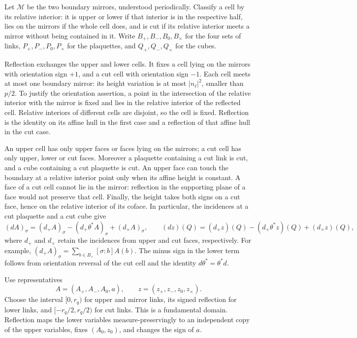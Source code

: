 \documentclass[11pt,letterpaper,reqno]{amsart}
\begin{document}
Let $\mathcal M$ be the two boundary mirrors, understood periodically.
Classify a cell by its relative interior: it is upper or lower if
that interior is in the respective half, lies on the mirrors if the
whole cell does, and is cut if its relative interior meets a mirror
without being contained in it. Write $B_+,B_-,B_0,B_\times$ for the
four sets of links, $P_+,P_-,P_0,P_\times$ for the plaquettes, and
$Q_+,Q_-,Q_\times$ for the cubes.

Reflection exchanges the upper and lower cells. It fixes a cell
lying on the mirrors with orientation sign $+1$, and a cut cell
with orientation sign $-1$. Each cell meets at most one boundary
mirror: its height variation is at most $|n_\ell|^2$, smaller than
$p/2$. To justify the orientation assertion, a point in the
intersection of the relative interior with the mirror is fixed
and lies in the relative interior of the reflected cell. Relative
interiors of different cells are disjoint, so the cell is fixed.
Reflection is the identity on its affine hull in the first case
and a reflection of that affine hull in the cut case.

An upper cell has only upper faces or faces lying on the mirrors;
a cut cell has only upper, lower or cut faces. Moreover a plaquette
containing a cut link is cut, and a cube containing a cut plaquette
is cut. An upper face can touch the boundary at a relative interior
point only when its affine height is constant. A face of a cut cell
cannot lie in the mirror: reflection in the supporting plane of a
face would not preserve that cell. Finally, the height takes both
signs on a cut face, hence on the relative interior of its coface.
In particular, the incidences at a cut plaquette and a cut cube give
\begin{equation}\label{eq:reg-cut-differentials}
 (dA)_\sigma=(d_+A)_\sigma-(d_+\theta^*A)_\sigma
                                      +(d_\times A)_\sigma,
 \qquad
 (dz)(Q)=(d_+z)(Q)-(d_+\theta^*z)(Q)+(d_\times z)(Q),
\end{equation}
where $d_+$ and $d_\times$ retain the incidences from upper and cut
faces, respectively. For example,
$(d_+A)_\sigma=\sum_{b\in B_+}[\sigma:b]A(b)$.
The minus sign in the lower term follows from orientation reversal
of the cut cell and the identity $d\theta^*=\theta^*d$.

Use representatives
\[
 A=(A_+,A_-,A_0,a),\qquad z=(z_+,z_-,z_0,z_\times).
\]
Choose the interval $[0,r_q)$ for upper and mirror links, its signed
reflection for lower links, and $[-r_q/2,r_q/2)$ for cut links.
This is a fundamental domain. Reflection maps the lower variables
measure-preservingly to an independent copy of the upper variables,
fixes $(A_0,z_0)$, and changes the sign of $a$.
\end{document}
